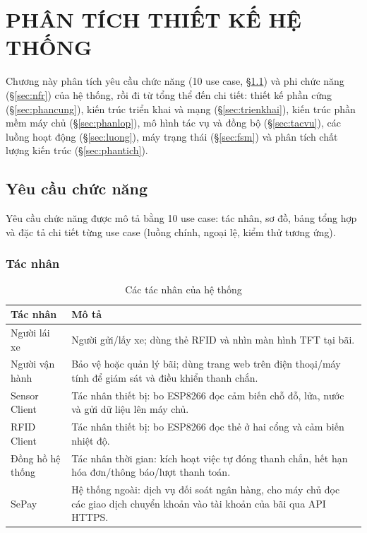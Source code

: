 \chapter{PHÂN TÍCH THIẾT KẾ HỆ THỐNG}\label{chap:thietke}

Chương này phân tích yêu cầu chức năng (10 use case, \S\ref{chap:usecase}) và phi chức năng
(\S\ref{sec:nfr}) của hệ thống, rồi đi từ tổng thể đến chi tiết: thiết kế phần cứng
(\S\ref{sec:phancung}), kiến trúc triển khai và mạng (\S\ref{sec:trienkhai}), kiến trúc phần
mềm máy chủ (\S\ref{sec:phanlop}), mô hình tác vụ và đồng bộ (\S\ref{sec:tacvu}), các luồng
hoạt động (\S\ref{sec:luong}), máy trạng thái (\S\ref{sec:fsm}) và phân tích chất lượng kiến
trúc (\S\ref{sec:phantich}).

\section{Yêu cầu chức năng}\label{chap:usecase}
Yêu cầu chức năng được mô tả bằng 10 use case: tác nhân, sơ đồ, bảng tổng hợp và đặc tả
chi tiết từng use case (luồng chính, ngoại lệ, kiểm thử tương ứng).

\subsection{Tác nhân}
\begin{table}[H]
\centering\small
\caption{Các tác nhân của hệ thống}\label{tab:actors}
\begin{tabularx}{\linewidth}{@{}lX@{}}
\toprule
\textbf{Tác nhân} & \textbf{Mô tả} \\ \midrule
Người lái xe & Người gửi/lấy xe; dùng thẻ RFID và nhìn màn hình TFT tại bãi. \\
Người vận hành & Bảo vệ hoặc quản lý bãi; dùng trang web trên điện thoại/máy tính để giám sát và điều khiển thanh chắn. \\
Sensor Client & Tác nhân thiết bị: bo ESP8266 đọc cảm biến chỗ đỗ, lửa, nước và gửi dữ liệu lên máy chủ. \\
RFID Client & Tác nhân thiết bị: bo ESP8266 đọc thẻ ở hai cổng và cảm biến nhiệt độ. \\
Đồng hồ hệ thống & Tác nhân thời gian: kích hoạt việc tự đóng thanh chắn, hết hạn hóa đơn/thông báo/lượt thanh toán. \\
SePay & Hệ thống ngoài: dịch vụ đối soát ngân hàng, cho máy chủ đọc các giao dịch chuyển khoản vào tài khoản của bãi qua API HTTPS. \\
\bottomrule
\end{tabularx}
\end{table}

